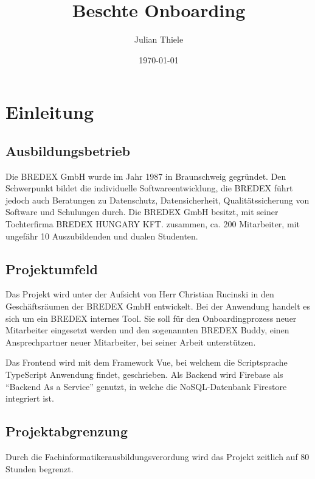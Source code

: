 \documentclass[12pt]{article}
\title{Beschte Onboarding}
\date{\today}
\author{Julian Thiele}
\begin{document}
\sloppy

\maketitle
\newpage

\tableofcontents
\newpage

%
%

\section{Einleitung}

\subsection{Ausbildungsbetrieb}
Die BREDEX GmbH wurde im Jahr 1987 in Braunschweig gegründet. Den Schwerpunkt 
bildet die individuelle Softwareentwicklung, die BREDEX führt jedoch auch 
Beratungen zu Datenschutz, Datensicherheit, Qualitätssicherung von Software 
und Schulungen durch. Die BREDEX GmbH besitzt, mit seiner Tochterfirma BREDEX 
HUNGARY KFT. zusammen, ca. 200 Mitarbeiter, mit ungefähr 10 Auszubildenden und dualen Studenten.  %

\subsection{Projektumfeld}
Das Projekt wird unter der Aufsicht von Herr Christian Rucinski in den 
Geschäftsräumen der BREDEX GmbH entwickelt. Bei der Anwendung handelt es sich 
um ein BREDEX internes Tool. Sie soll für den Onboardingprozess neuer Mitarbeiter 
eingesetzt werden und den sogenannten BREDEX Buddy, einen Ansprechpartner 
neuer Mitarbeiter, bei seiner Arbeit unterstützen. 

Das Frontend wird mit dem Framework Vue, bei welchem die Scriptsprache TypeScript 
Anwendung findet, geschrieben. Als Backend wird Firebase als “Backend As a Service” 
genutzt, in welche die NoSQL-Datenbank Firestore integriert ist.

\subsection{Projektabgrenzung}
Durch die Fachinformatikerausbildungsverordung wird das Projekt zeitlich auf 80 
Stunden begrenzt.  
\end{document}

